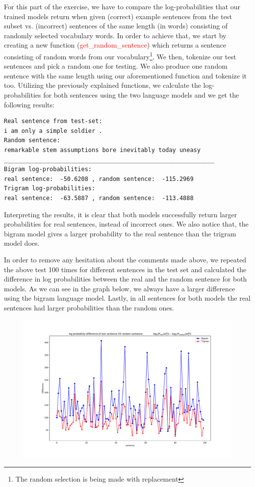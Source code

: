 \documentclass[11pt]{article}
\begin{document}
For this part of the exercise, we have to compare the log-probabilities that our trained models return when given (correct) example sentences from the test subset vs. (incorrect) sentences of the same length (in words) consisting of randomly selected vocabulary words. 
In order to achieve that, we start by creating a new function (\textcolor{red}{get\_random\_sentence}) which returns a sentence consisting of random words from our vocabulary\footnote{The random selection is being made with replacement}. We then, tokenize our test sentences and pick a random one for testing. 
We also produce one random sentence with the same length using our aforementioned function and tokenize it too. 
Utilizing the previously explained functions, we calculate the log-probabilities for both sentences using the two language models and we get the following results:

\begin{verbatim}
Real sentence from test-set: 
i am only a simple soldier .
Random sentence: 
remarkable stem assumptions bore inevitably today uneasy
____________________________________________________________
Bigram log-probabilities:
real sentence:  -50.6208 , random sentence:  -115.2969
Trigram log-probabilities:
real sentence:  -63.5887 , random sentence:  -113.4888
\end{verbatim}

Interpreting the results, it is clear that both models successfully return larger probabilities for real sentences, instead of incorrect ones. We also notice that, the bigram model gives a larger probability to the real sentence than the trigram model does.

In order to remove any hesitation about the comments made above, we repeated the above test 100 times for different sentences in the test set and calculated the difference in log probabilities between the real and the random sentence for both models. 
As we can see in the graph below, we always have a larger difference using the bigram language model. Lastly, in all sentences for both models the real sentences had larger probabilities than the random ones.
\newpage
\begin{figure}[h]
\includegraphics[width=\textwidth]{Real_VS_Random.pdf}
\end{figure}
\end{document}
